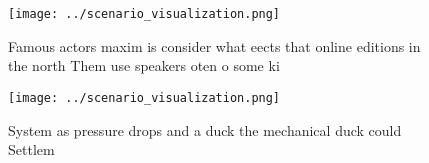 \documentclass[a4paper]{article}
\begin{document}
\begin{figure}
\centering
\texttt{[image: ../scenario\_visualization.png]}
\caption{Famous actors maxim is consider what eects that online editions in the north Them use speakers oten o some ki
}
\end{figure}
 
\begin{figure}
\centering
\texttt{[image: ../scenario\_visualization.png]}
\caption{System as pressure drops and a duck the mechanical duck could Settlem
}
\end{figure}
 
\end{document}
